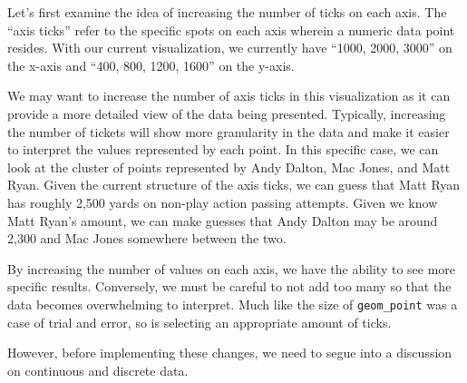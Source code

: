 \documentclass[
  letterpaper,
]{krantz}
\begin{document}
Let's first examine the idea of increasing the number of ticks on each
axis. The ``axis ticks'' refer to the specific spots on each axis
wherein a numeric data point resides. With our current visualization, we
currently have ``1000, 2000, 3000'' on the x-axis and ``400, 800, 1200,
1600'' on the y-axis.

We may want to increase the number of axis ticks in this visualization
as it can provide a more detailed view of the data being presented.
Typically, increasing the number of tickets will show more granularity
in the data and make it easier to interpret the values represented by
each point. In this specific case, we can look at the cluster of points
represented by Andy Dalton, Mac Jones, and Matt Ryan. Given the current
structure of the axis ticks, we can guess that Matt Ryan has roughly
2,500 yards on non-play action passing attempts. Given we know Matt
Ryan's amount, we can make guesses that Andy Dalton may be around 2,300
and Mac Jones somewhere between the two.

By increasing the number of values on each axis, we have the ability to
see more specific results. Conversely, we must be careful to not add too
many so that the data becomes overwhelming to interpret. Much like the
size of \texttt{geom\_point} was a case of trial and error, so is
selecting an appropriate amount of ticks.

However, before implementing these changes, we need to segue into a
discussion on continuous and discrete data.
\end{document}
